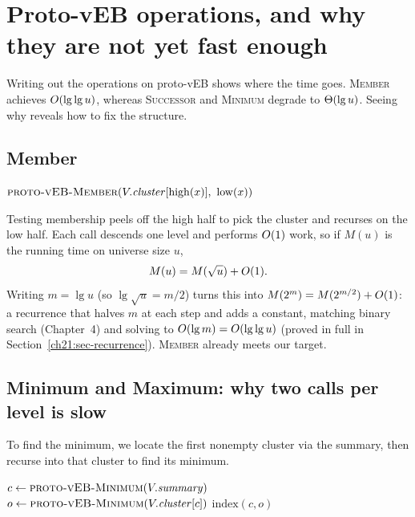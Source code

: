 \section{Proto-vEB operations, and why they are not yet fast enough}

Writing out the operations on proto-vEB shows where the time goes. \textsc{Member} achieves $O(\lg\lg u)$, whereas \textsc{Successor} and \textsc{Minimum} degrade to $\Theta(\lg u)$. Seeing why reveals how to fix the structure.

\subsection{Member}

\begin{algorithm}[H]
\caption{\textsc{proto-vEB-Member}($V, x$)}
\Return $\textsc{proto-vEB-Member}(V.\mathit{cluster}[\mathrm{high}(x)],\ \mathrm{low}(x))$\;
\end{algorithm}

Testing membership peels off the high half to pick the cluster and recurses on
the low half. Each call descends one level and performs $O(1)$ work, so if $M(u)$ is the running time on universe size $u$,
\[
  M(u) = M(\sqrt{u}) + O(1).
\]
Writing $m = \lg u$ (so $\lg\sqrt{u} = m/2$) turns this into $M(2^m) = M(2^{m/2}) + O(1)$: a recurrence that halves $m$ at each step and adds a constant, matching binary search (Chapter~4) and solving to $O(\lg m) = O(\lg\lg u)$ (proved in full in Section~\ref{ch21:sec-recurrence}). \textsc{Member} already meets our target.

\subsection{Minimum and Maximum: why two calls per level is slow}

To find the minimum, we locate the first nonempty cluster via the summary,
then recurse into that cluster to find its minimum.

\begin{algorithm}[H]
\caption{\textsc{proto-vEB-Minimum}($V$)}
$c \leftarrow \textsc{proto-vEB-Minimum}(V.\mathit{summary})$
$o \leftarrow \textsc{proto-vEB-Minimum}(V.\mathit{cluster}[c])$
\Return $\mathrm{index}(c, o)$\;
\end{algorithm}

